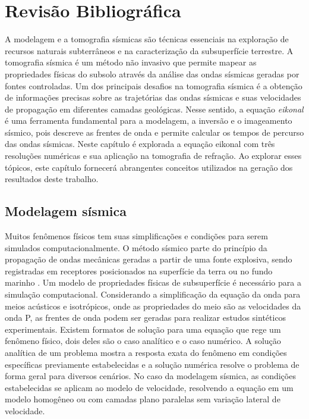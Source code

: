 \chapter{Revisão Bibliográfica}
\label{ch:revisaobibliografica}

A modelagem e a tomografia sísmicas são técnicas essenciais na exploração de recursos naturais subterrâneos e na caracterização da subsuperfície terrestre. A tomografia sísmica é um método não invasivo que permite mapear as propriedades físicas do subsolo através da análise das ondas sísmicas geradas por fontes controladas. Um dos principais desafios na tomografia sísmica é a obtenção de informações precisas sobre as trajetórias das ondas sísmicas e suas velocidades de propagação em diferentes camadas geológicas. Nesse sentido, a equação \textit{eikonal}  é uma ferramenta fundamental para a modelagem, a inversão e o imageamento sísmico, pois descreve as frentes de onda e permite calcular os tempos de percurso das ondas sísmicas. Neste capítulo é explorada a equação eikonal com três resoluções numéricas e sua aplicação na tomografia de refração. Ao explorar esses tópicos, este capítulo fornecerá abrangentes conceitos utilizados na geração dos resultados deste trabalho.

\section{Modelagem sísmica}

Muitos fenômenos físicos tem suas simplificações e condições para serem simulados computacionalmente. O método sísmico parte do princípio da propagação de ondas mecânicas geradas a partir de uma fonte explosiva, sendo registradas em receptores posicionados na superfície da terra ou no fundo marinho \cite{sheriff1995exploration, rosa2010analise}. Um modelo de propriedades físicas de subsuperfície é necessário para a simulação computacional. Considerando a simplificação da equação da onda para meios acústicos e isotrópicos, onde as propriedades do meio são as velocidades da onda P, as frentes de onda podem ser geradas para realizar estudos sintéticos experimentais. Existem formatos de solução para uma equação que rege um fenômeno físico, dois deles são o caso analítico e o caso numérico. A solução analítica de um problema mostra a resposta exata do fenômeno em condições específicas previamente estabelecidas e a solução numérica resolve o problema de forma geral para diversos cenários. No caso da modelagem sísmica, as condições estabelecidas se aplicam ao modelo de velocidade, resolvendo a equação em um modelo homogêneo ou com camadas plano paralelas sem variação lateral de velocidade.  

